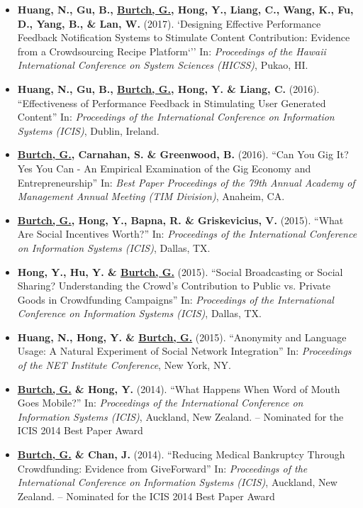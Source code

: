 \documentclass[10.5pt,letterpaper,sans]{moderncv}        %
\begin{document}
\begin{itemize}
\item \textbf{Huang, N., Gu, B., \underline{Burtch, G.}, Hong, Y., Liang, C., Wang, K., Fu, D., Yang, B., \& Lan, W.} (2017). `Designing Effective Performance Feedback Notification Systems to Stimulate Content Contribution: Evidence from a Crowdsourcing Recipe Platform`'' In: \textit{Proceedings of the Hawaii International Conference on System Sciences (HICSS)}, Pukao, HI.

\item \textbf{Huang, N., Gu, B., \underline{Burtch, G.}, Hong, Y. \& Liang, C.} (2016). ``Effectiveness of Performance Feedback in Stimulating User Generated Content'' In: \textit{Proceedings of the International Conference on Information Systems (ICIS)}, Dublin, Ireland.

\item \textbf{\underline{Burtch, G.}, Carnahan, S. \& Greenwood, B.} (2016). ``Can You Gig It? Yes You Can - An Empirical Examination of the Gig Economy and Entrepreneurship'' In: \textit{Best Paper Proceedings of the 79th Annual Academy of Management Annual Meeting (TIM Division)}, Anaheim, CA.

\item \textbf{\underline{Burtch, G.}, Hong, Y., Bapna, R. \& Griskevicius, V.} (2015). ``What Are Social Incentives Worth?'' In: \textit{Proceedings of the International Conference on Information Systems (ICIS)}, Dallas, TX.

\item \textbf{Hong, Y., Hu, Y. \& \underline{Burtch, G.}} (2015). ``Social Broadcasting or Social Sharing? Understanding the Crowd's Contribution to Public vs. Private Goods in Crowdfunding Campaigns'' In: \textit{Proceedings of the International Conference on Information Systems (ICIS)}, Dallas, TX.

\item \textbf{Huang, N., Hong, Y. \& \underline{Burtch, G.}} (2015). ``Anonymity and Language Usage: A Natural Experiment of Social Network Integration'' In: \textit{Proceedings of the NET Institute Conference}, New York, NY.

\item \textbf{\underline{Burtch, G.} \& Hong, Y.} (2014). ``What Happens When Word of Mouth Goes Mobile?'' In: \textit{Proceedings of the International Conference on Information Systems (ICIS)}, Auckland, New Zealand. \newline-- Nominated for the ICIS 2014 Best Paper Award

\item \textbf{\underline{Burtch, G.} \& Chan, J.} (2014). ``Reducing Medical Bankruptcy Through Crowdfunding: Evidence from GiveForward'' In: \textit{Proceedings of the International Conference on Information Systems (ICIS)}, Auckland, New Zealand. \newline-- Nominated for the ICIS 2014 Best Paper Award


\end{itemize}
\end{document}
